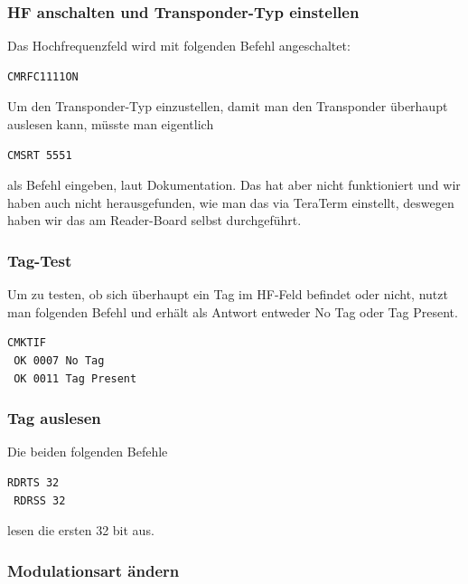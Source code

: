 \documentclass[paper=a4,fontsize=11pt,headsepline,footsepline,parskip=half]{scrartcl}
\begin{document}
\subsubsection{HF anschalten und Transponder-Typ einstellen}

Das Hochfrequenzfeld wird mit folgenden Befehl angeschaltet:

\begin{lstlisting}[caption={HF anschalten.}]
 CMRFC1111ON
\end{lstlisting}

Um den Transponder-Typ einzustellen, damit man den Transponder überhaupt auslesen kann, müsste man eigentlich

\begin{lstlisting}[caption={Transponder-Typ einstellen.}]
 CMSRT 5551
\end{lstlisting}

als Befehl eingeben, laut Dokumentation. Das hat aber nicht funktioniert und wir haben auch nicht herausgefunden, wie man das via TeraTerm
einstellt, deswegen haben wir das am Reader-Board selbst durchgeführt.

\subsubsection{Tag-Test}

Um zu testen, ob sich überhaupt ein Tag im HF-Feld befindet oder nicht, nutzt man folgenden Befehl und erhält als Antwort entweder \glqq
No Tag\grqq{} oder \glqq Tag Present\grqq.

\begin{lstlisting}[caption={Vorhandensein des Tags im HF-Feld testen.}]
 CMKTIF
 OK 0007 No Tag
 OK 0011 Tag Present
\end{lstlisting}

\subsubsection{Tag auslesen}

Die beiden folgenden Befehle

\begin{lstlisting}[caption={Tag auslesen.}]
 RDRTS 32
 RDRSS 32
\end{lstlisting}

lesen die ersten 32 bit aus.

\subsubsection{Modulationsart ändern}
\end{document}
